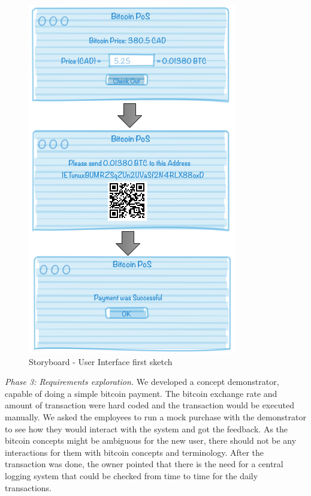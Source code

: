 \begin{figure}[h]
\centering
\includegraphics[scale=0.5]{fig/RE_Scenario_Interface}
  \caption{Storyboard - User Interface first sketch}
\label{fig:storyboard}
\end{figure}


\textit{Phase 3: Requirements exploration.}
We developed a concept demonstrator, capable of doing a simple bitcoin payment. The bitcoin exchange rate and amount of transaction were hard coded and the transaction would be executed manually. We asked the employees to run a mock purchase with the demonstrator to see how they would interact with the system and got the feedback. As the bitcoin concepts might be ambiguous for the new user, there should not be any interactions for them with bitcoin concepts and terminology. After the transaction was done, the owner pointed that there is the need for a central logging system that could be checked from time to time for the daily transactions.\\


